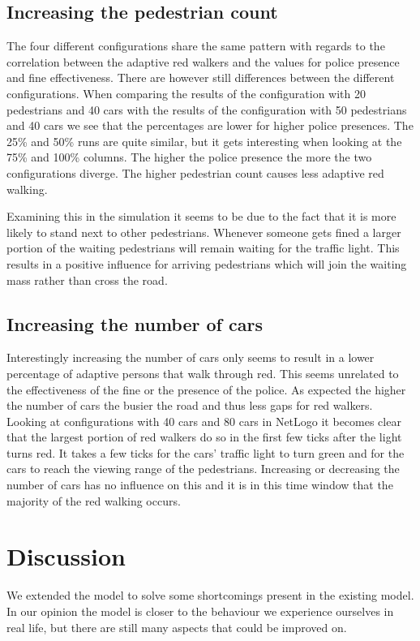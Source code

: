 \documentclass[a4paper]{article}
\begin{document}
\subsection{Increasing the pedestrian count}
The four different configurations share the same pattern with regards to the correlation between the adaptive red walkers and the values for police presence and fine effectiveness. There are however still differences between the different configurations. When comparing the results of the configuration with 20 pedestrians and 40 cars with the results of the configuration with 50 pedestrians and 40 cars we see that the percentages are lower for higher police presences. The 25\% and 50\% runs are quite similar, but it gets interesting when looking at the 75\% and 100\% columns. The higher the police presence the more the two configurations diverge. The higher pedestrian count causes less adaptive red walking.

Examining this in the simulation it seems to be due to the fact that it is more likely to stand next to other pedestrians. Whenever someone gets fined a larger portion of the waiting pedestrians will remain waiting for the traffic light. This results in a positive influence for arriving pedestrians which will join the waiting mass rather than cross the road.

\subsection{Increasing the number of cars}
Interestingly increasing the number of cars only seems to result in a lower percentage of adaptive persons that walk through red. This seems unrelated to the effectiveness of the fine or the presence of the police. As expected the higher the number of cars the busier the road and thus less gaps for red walkers. Looking at configurations with 40 cars and 80 cars in NetLogo it becomes clear that the largest portion of red walkers do so in the first few ticks after the light turns red. It takes a few ticks for the cars' traffic light to turn green and for the cars to reach the viewing range of the pedestrians. Increasing or decreasing the number of cars has no influence on this and it is in this time window that the majority of the red walking occurs.

\clearpage

\section{Discussion}
We extended the model to solve some shortcomings present in the existing model. In our opinion the model is closer to the behaviour we experience ourselves in real life, but there are still many aspects that could be improved on.
\end{document}
